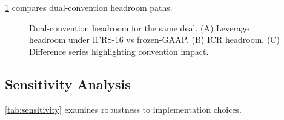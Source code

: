 \documentclass[11pt,a4paper]{article}
\theoremstyle{plain}
\theoremstyle{definition}
\newcommand{\Cref}[1]{\ref{#1}}
\begin{document}
\Cref{fig:dual_convention} compares dual-convention headroom paths.

\begin{figure}[h]
\centering
{}
\caption{Dual-convention headroom for the same deal. (A) Leverage headroom under IFRS-16 vs frozen-GAAP. (B) ICR headroom. (C) Difference series highlighting convention impact.}
\label{fig:dual_convention}
\end{figure}

\subsection{Sensitivity Analysis}

\Cref{tab:sensitivity} examines robustness to implementation choices.
\end{document}
